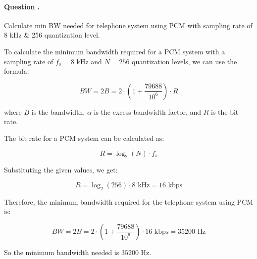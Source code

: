 \documentclass[14pt,a4paper]{report}
\newcounter{question}
\newcommand*\question{%
\stepcounter{question}%
\paragraph{Question \thesection.\thequestion}}
\begin{document}
\question 
{
    Calculate min BW needed for telephone system using PCM with sampling rate of 8 kHz \& 256 quantization level.
}
\begin{answer_box*}
    To calculate the minimum bandwidth required for a PCM system with a sampling rate of $f_s = 8 \text{ kHz}$ and $N = 256$ quantization levels, we can use the formula:

    \begin{equation}
    BW = 2B = 2 \cdot (1 + \frac{79688}{10^6}) \cdot R
    \end{equation}
    
    where $B$ is the bandwidth, $\alpha$ is the excess bandwidth factor, and $R$ is the bit rate.
    
    The bit rate for a PCM system can be calculated as:
    
    \begin{equation}
    R = \log_2(N) \cdot f_s
    \end{equation}
    
    Substituting the given values, we get:
    
    \begin{equation}
    R = \log_2(256) \cdot 8 \text{ kHz} = 16 \text{ kbps}
    \end{equation}
    
    Therefore, the minimum bandwidth required for the telephone system using PCM is:
    
    \begin{equation}
    BW = 2B = 2 \cdot (1 + \frac{79688}{10^6}) \cdot 16 \text{ kbps} = 35200 \text{ Hz}
    \end{equation}
    
    So the minimum bandwidth needed is $35200 \text{ Hz}$.

\end{answer_box*}
\end{document}
